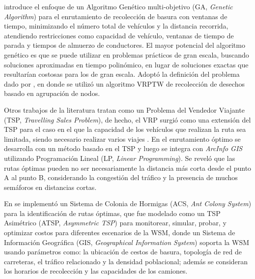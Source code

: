 \citet{Ombuki-Berman2007WASTEALGORITHMS} introduce el enfoque de un Algoritmo Genético multi-objetivo (GA, \textit{Genetic Algorithm}) para el enrutamiento de recolección de basura con ventanas de tiempo, minimizando el número total de vehículos y la distancia recorrida, atendiendo restricciones como capacidad de vehículo, ventanas de tiempo de parada y tiempos de almuerzo de conductores. El mayor potencial del algoritmo genético es que se puede utilizar en problemas prácticos de gran escala, buscando soluciones aproximadas en tiempo polinómico, en lugar de soluciones exactas que resultarían costosas para los de gran escala. Adoptó la definición del problema dado por \citet{Kim2006WasteWindows}, en donde se utilizó un algoritmo VRPTW de recolección de desechos basado en agrupación de nodos.

Otros trabajos de la literatura tratan como un Problema del Vendedor Viajante (TSP, \textit{Travelling Sales Problem}), de hecho, el VRP surgió como una extensión del TSP para el caso en el que la capacidad de los vehículos que realizan la ruta sea limitada, siendo necesario realizar varios viajes \citep{CalvinoM2011CooperacionPanoramica}. En \citet{Billa2014GISOptimization} el enrutamiento óptimo se desarrolla con un método basado en el TSP y luego se integra con \textit{ArcInfo GIS} utilizando Programación Lineal (LP, \textit{Linear Programming}). Se reveló que las rutas óptimas pueden no ser necesariamente la distancia más corta desde el punto A al punto B, considerando la congestión del tráfico y la presencia de muchos semáforos en distancias cortas.

En \citet{Karadimas2007OptimalAlgorithm} se implementó un Sistema de Colonia de Hormigas (ACS, \textit{Ant Colony System}) para la identificación de rutas óptimas, que fue modelado como un TSP Asimétrico (ATSP, \textit{Asymmetric TSP}) para monitorear, simular, probar, y optimizar costos para diferentes escenarios de la WSM, donde un Sistema de Información Geográfica (GIS, \textit{Geographical Information System}) soporta la WSM usando parámetros como: la ubicación de cestos de basura, topología de red de carreteras, el tráfico relacionado y la densidad poblacional; además se consideran los horarios de recolección y las capacidades de los camiones.

